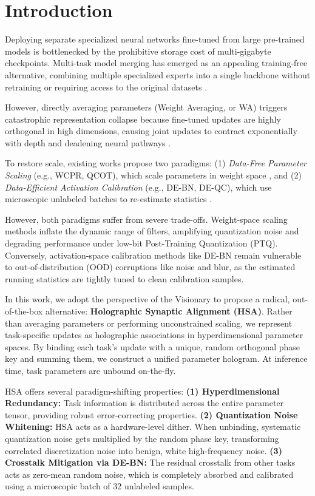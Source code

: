 \documentclass{article}
\theoremstyle{plain}
\theoremstyle{definition}
\theoremstyle{remark}
\begin{document}
\section{Introduction}
Deploying separate specialized neural networks fine-tuned from large pre-trained models is bottlenecked by the prohibitive storage cost of multi-gigabyte checkpoints. Multi-task model merging has emerged as an appealing training-free alternative, combining multiple specialized experts into a single backbone without retraining or requiring access to the original datasets \cite{wortsman2022model, ilharco2023editing}.

However, directly averaging parameters (Weight Averaging, or WA) triggers catastrophic representation collapse because fine-tuned updates are highly orthogonal in high dimensions, causing joint updates to contract exponentially with depth and deadening neural pathways \cite{jordan2023repair}.

To restore scale, existing works propose two paradigms: (1) \emph{Data-Free Parameter Scaling} (e.g., WCPR, QCOT), which scale parameters in weight space \cite{anonymous2026b, anonymous2026c}, and (2) \emph{Data-Efficient Activation Calibration} (e.g., DE-BN, DE-QC), which use microscopic unlabeled batches to re-estimate statistics \cite{anonymous2026a, jordan2023repair}. 

However, both paradigms suffer from severe trade-offs. Weight-space scaling methods inflate the dynamic range of filters, amplifying quantization noise and degrading performance under low-bit Post-Training Quantization (PTQ). Conversely, activation-space calibration methods like DE-BN remain vulnerable to out-of-distribution (OOD) corruptions like noise and blur, as the estimated running statistics are tightly tuned to clean calibration samples.

In this work, we adopt the perspective of the Visionary to propose a radical, out-of-the-box alternative: \textbf{Holographic Synaptic Alignment (HSA)}. Rather than averaging parameters or performing unconstrained scaling, we represent task-specific updates as holographic associations in hyperdimensional parameter spaces. By binding each task's update with a unique, random orthogonal phase key and summing them, we construct a unified parameter hologram. At inference time, task parameters are unbound on-the-fly. 

HSA offers several paradigm-shifting properties:
\textbf{(1) Hyperdimensional Redundancy:} Task information is distributed across the entire parameter tensor, providing robust error-correcting properties.
\textbf{(2) Quantization Noise Whitening:} HSA acts as a hardware-level dither. When unbinding, systematic quantization noise gets multiplied by the random phase key, transforming correlated discretization noise into benign, white high-frequency noise.
\textbf{(3) Crosstalk Mitigation via DE-BN:} The residual crosstalk from other tasks acts as zero-mean random noise, which is completely absorbed and calibrated using a microscopic batch of 32 unlabeled samples.
\end{document}
